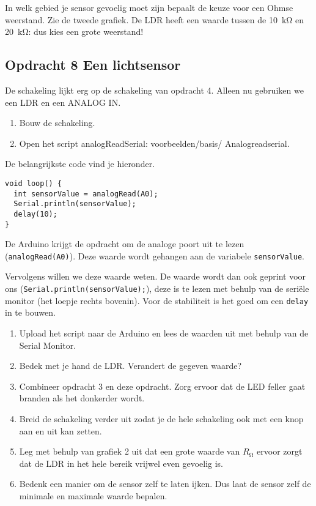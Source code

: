\documentclass{arduino}
\begin{document}
In welk gebied je sensor gevoelig moet zijn bepaalt de keuze voor een Ohmse weerstand. Zie de tweede grafiek. De LDR heeft een waarde tussen de \SI{10}{\kilo\ohm} en \SI{20}{\kilo\ohm}: dus kies een grote weerstand!

\newpage

\subsection{Opdracht 8 Een lichtsensor}


De schakeling lijkt erg op de schakeling van opdracht 4. Alleen nu gebruiken we een LDR en een ANALOG IN.

\begin{enumerate}[label={\alph*})]
\item Bouw de schakeling.

\item Open het script analogReadSerial: voorbeelden/basis/ Analogreadserial.
\end{enumerate}

De belangrijkste code vind je hieronder.

\begin{lstlisting}
void loop() {
  int sensorValue = analogRead(A0);
  Serial.println(sensorValue);
  delay(10);
}
\end{lstlisting}

De Arduino krijgt de opdracht om de analoge poort uit te lezen (\lstinline{analogRead(A0)}). Deze waarde wordt gehangen aan de variabele \lstinline{sensorValue}. 

Vervolgens willen we deze waarde weten. De waarde wordt dan ook geprint voor ons (\lstinline{Serial.println(sensorValue);}), deze is te lezen met behulp van de seriële monitor (het loepje rechts bovenin). Voor de stabiliteit is het goed om een \lstinline{delay} in te bouwen.

\begin{enumerate}[label={\alph*})]
\item Upload het script naar de Arduino en lees de waarden uit met behulp van de Serial Monitor.

\item Bedek met je hand de LDR. Verandert de gegeven waarde?

\item Combineer opdracht 3 en deze opdracht. Zorg ervoor dat de LED feller gaat branden als het donkerder wordt.

\item Breid de schakeling verder uit zodat je de hele schakeling ook met een knop aan en uit kan zetten.

\item Leg met behulp van grafiek 2 uit dat een grote waarde van $R_{\si{\ohm}}$ ervoor zorgt dat de LDR in het hele bereik vrijwel even gevoelig is.

\item Bedenk een manier om de sensor zelf te laten ijken. Dus laat de sensor zelf de minimale en maximale waarde bepalen.
\end{enumerate}
\end{document}
